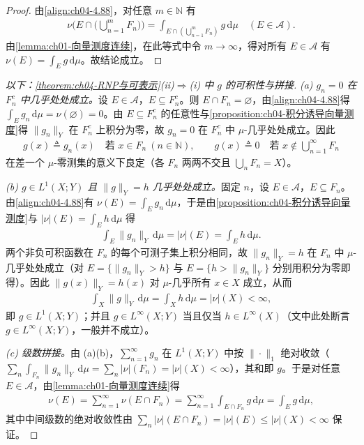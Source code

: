 \documentclass[../../main.tex]{subfiles}%
\begin{document}
\begin{proof}
由\eqref{align:ch04-4.88}，对任意 $m\in\mathbb{N}$ 有
\begin{align*}
\nu\Big(E\cap\Big(\bigcup_{n=1}^mF_n\Big)\Big)=\int_{E\cap(\bigcup_{n=1}^mF_n)}g\,\mathrm{d}\mu\quad(E\in\mathcal{A}).
\end{align*}
由\cref{lemma:ch01-向量测度连续}，在此等式中令 $m\to\infty$，得对所有 $E\in\mathcal{A}$ 有 $\nu(E)=\int_E g\,\mathrm{d}\mu$。故结论成立。
\end{proof}

\begin{proof}[以下：\cref{theorem:ch04-RNP与可表示}(ii)$\Rightarrow$(i) 中 $g$ 的可积性与拼接]
\emph{(a) $g_n=0$ 在 $F_n^c$ 中几乎处处成立。}设 $E\in\mathcal{A}$，$E\subseteq F_n^c$。则 $E\cap F_n=\varnothing$，由\eqref{align:ch04-4.88}得 $\int_E g_n\,\mathrm{d}\mu=\nu(\varnothing)=0$。由 $E\subseteq F_n^c$ 的任意性与\cref{proposition:ch04-积分诱导向量测度}得 $\|g_n\|_Y$ 在 $F_n^c$ 上积分为零，故 $g_n=0$ 在 $F_n^c$ 中 $\mu$-几乎处处成立。因此
\begin{align*}
g(x)\triangleq g_n(x)\quad\text{若 }x\in F_n\ (n\in\mathbb{N}),\qquad g(x)\triangleq0\quad\text{若 }x\notin\bigcup_{n=1}^\infty F_n
\end{align*}
在差一个 $\mu$-零测集的意义下良定（各 $F_n$ 两两不交且 $\bigcup_nF_n=X$）。

\emph{(b) $g\in L^1(X;Y)$ 且 $\|g\|_Y=h$ 几乎处处成立。}固定 $n$，设 $E\in\mathcal{A}$，$E\subseteq F_n$。由\eqref{align:ch04-4.88}有 $\nu(E)=\int_E g_n\,\mathrm{d}\mu$，于是由\cref{proposition:ch04-积分诱导向量测度}与 $|\nu|(E)=\int_E h\,\mathrm{d}\mu$ 得
\begin{align*}
\int_E\|g_n\|_Y\,\mathrm{d}\mu=|\nu|(E)=\int_E h\,\mathrm{d}\mu.
\end{align*}
两个非负可积函数在 $F_n$ 的每个可测子集上积分相同，故 $\|g_n\|_Y=h$ 在 $F_n$ 中 $\mu$-几乎处处成立（对 $E=\{\|g_n\|_Y>h\}$ 与 $E=\{h>\|g_n\|_Y\}$ 分别用积分为零即得）。因此 $\|g(x)\|_Y=h(x)$ 对 $\mu$-几乎所有 $x\in X$ 成立，从而
\begin{align*}
\int_X\|g\|_Y\,\mathrm{d}\mu=\int_X h\,\mathrm{d}\mu=|\nu|(X)<\infty,
\end{align*}
即 $g\in L^1(X;Y)$；并且 $g\in L^\infty(X;Y)$ 当且仅当 $h\in L^\infty(X)$（文中此处断言 $g\in L^\infty(X;Y)$，一般并不成立）。

\emph{(c) 级数拼接。}由 (a)(b)，$\sum_{n=1}^\infty g_n$ 在 $L^1(X;Y)$ 中按 $\|\cdot\|_1$ 绝对收敛（$\sum_n\int_{F_n}\|g_n\|_Y\,\mathrm{d}\mu=\sum_n|\nu|(F_n)=|\nu|(X)<\infty$），其和即 $g$。于是对任意 $E\in\mathcal{A}$，由\cref{lemma:ch01-向量测度连续}得
\begin{align*}
\nu(E)=\sum_{n=1}^\infty\nu(E\cap F_n)=\sum_{n=1}^\infty\int_{E\cap F_n}g\,\mathrm{d}\mu=\int_E g\,\mathrm{d}\mu,
\end{align*}
其中中间级数的绝对收敛性由 $\sum_n|\nu|(E\cap F_n)=|\nu|(E)\leqslant|\nu|(X)<\infty$ 保证。
\end{proof}
\end{document}
